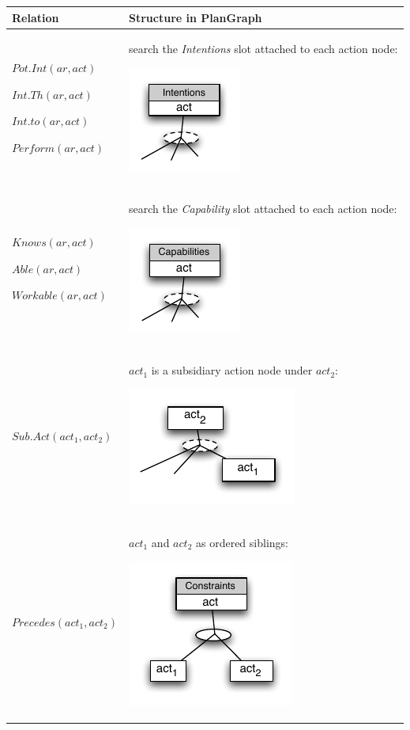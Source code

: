 {\footnotesize
\begin{longtable}{>{\raggedright}p{1.5in}>{\raggedright}p{4in}}
\toprule 
Relation & Structure in PlanGraph\tabularnewline
\midrule 
$Pot.Int(ar,act)$ \par $Int.Th(ar,act)$ \par $Int.to(ar,act)$ \par $Perform(ar,act)$ & search the \emph{Intentions} slot attached to each action node: 
\par \includegraphics{intentions.pdf}\tabularnewline
\midrule 
$Knows(ar,act)$ \par $Able(ar,act)$ \par $Workable(ar,act)$ & search the \emph{Capability} slot attached to each action node: 
\par \includegraphics{capabilities.pdf}\tabularnewline
\midrule 
$Sub.Act(act_1, act_2)$ &  $act_1$ is a subsidiary action node under $act_2$: 
\par \includegraphics{sub_act.pdf} \tabularnewline
\midrule 
$Precedes(act_1, act_2)$ &  $act_1$ and $act_2$ as ordered siblings: 
\par \includegraphics{precedes.pdf}\tabularnewline

\end{longtable}}
